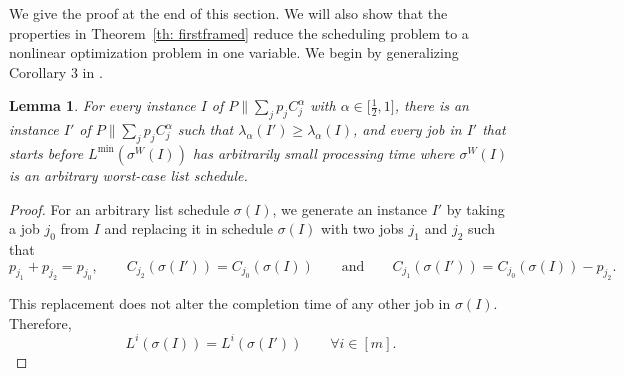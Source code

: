 \documentclass[%
english, titlepage=false %
]{./tum-templates/book/tumbook}
\newtheorem{lemma}{Lemma}
\newcommand{\Problem}{P\!\parallel\!\sum_j p_j C^{\alpha}_j}
\newcommand{\LamI}{\lambda_{\alpha}(I)}
\newcommand{\machLoad}{L^{i}(\sigma(I))}
\begin{document}
We give the proof at the end of this section.
We will also show that the properties in Theorem~\ref{th: firstframed}
reduce the scheduling problem to a nonlinear optimization problem in one variable.
We begin by generalizing Corollary 3 in \cite{Schwiegelshohn:2011}.

\begin{lemma}\label{corr:splitting-jobs}
For every instance $I$ of $\Problem$ with $\alpha \in \Big[\frac12,1\Big]$, there is an
instance $I'$ of $\Problem$ such that
$\lambda_{\alpha}(I')\geq\LamI$, and every job in $I'$ that starts before
$L^{\min}(\sigma^{W}(I))$ has arbitrarily small processing time where $\sigma^W(I)$ is an arbitrary worst-case list schedule.
\end{lemma}

\begin{proof}
For an arbitrary list schedule $\sigma(I)$, we generate an instance $I'$ by taking a job $j_0$ from
$I$ and replacing it in schedule $\sigma(I)$ with two jobs $j_1$ and $j_2$ such
that
\[
        p_{j_1}+p_{j_2}=p_{j_0},
        \qquad
        C_{j_2}(\sigma(I'))=C_{j_0}(\sigma(I)) \qquad \text{and}
        \qquad
        C_{j_1}(\sigma(I'))=C_{j_0}(\sigma(I))-p_{j_2}.
\]


This replacement does not alter the completion time of any other job in
$\sigma(I)$. Therefore, 
\[
       \machLoad=L^i(\sigma(I')) \qquad \forall i \in [m].
\]


\end{proof}
\end{document}

